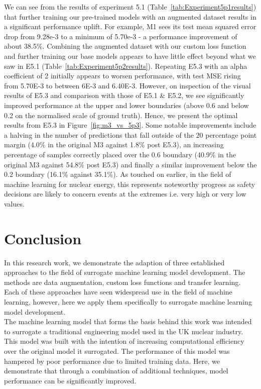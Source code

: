 \noindent
We can see from the results of experiment 5.1 (Table~\ref{tab:Experiment5p1results}) that further training our pre-trained models with an augmented dataset results in a significant performance uplift. For example, M1 sees its test mean squared error drop from 9.28e-3 to a minimum of 5.70e-3 - a performance improvement of about 38.5\%. Combining the augmented dataset with our custom loss function and further training our base models appears to have little effect beyond what we saw in E5.1 (Table~\ref{tab:Experiment5p2results}). Repeating E5.3 with an alpha coefficient of 2 initially appears to worsen performance, with test MSE rising from 5.70E-3 to between 6E-3 and 6.40E-3. However, on inspection of the visual results of E5.3 and comparison with those of E5.1 \& E5.2, we see significantly improved performance at the upper and lower boundaries (above 0.6 and below 0.2 on the normalised scale of ground truth). Hence, we present the optimal results from E5.3 in Figure~\ref{fig:m3_vs_5p3}. Some notable improvements include a halving in the number of predictions that fall outside of the 20 percentage point margin (4.0\% in the original M3 against 1.8\% post E5.3), an increasing percentage of samples correctly placed over the 0.6 boundary (40.9\% in the original M3 against 54.8\% post E5.3) and finally a similar improvement below the 0.2 boundary (16.1\% against 35.1\%). As touched on earlier, in the field of machine learning for nuclear energy, this represents noteworthy progress as safety decisions are likely to concern events at the extremes i.e. very high or very low values.


\section{Conclusion}

In this research work, we demonstrate the adaption of three established approaches to the field of surrogate machine learning model development. The methods are data augmentation, custom loss functions and transfer learning. Each of these approaches have seen widespread use in the field of machine learning, however, here we apply them specifically to surrogate machine learning model development.
\\

\noindent
The machine learning model that forms the basis behind this work was intended to surrogate a traditional engineering model used in the UK nuclear industry. This model was built with the intention of increasing computational efficiency over the original model it surrogated. The performance of this model was hampered by poor performance due to limited training data. Here, we demonstrate that through a combination of additional techniques, model performance can be significantly improved.
\\

